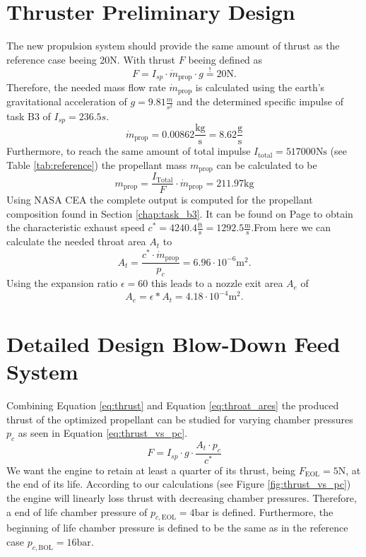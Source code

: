 \documentclass[12pt]{article}
\begin{document}
\section{Thruster Preliminary Design}
The new propulsion system should provide the same amount of thrust as the reference case beeing 20N. With thrust $F$ beeing defined as
\begin{equation}
	F = I_{sp} \cdot \dot{m}_{\text{prop}} \cdot g \overset{!}{=} 20\text{N}.
	\label{eq:thrust}
\end{equation}
Therefore, the needed mass flow rate $\dot{m}_{\text{prop}}$ is calculated using the earth's gravitational acceleration of $g=9.81\frac{m}{s^2}$ and the determined specific impulse of task B3 of $I_{sp}=236.5s$.
\begin{equation*}
	\dot{m}_{\text{prop}} = 0.00862 \frac{\text{kg}}{\text{s}} = 8.62 \frac{\text{g}}{\text{s}}
\end{equation*}
Furthermore, to reach the same amount of total impulse $I_{\text{total}}=517000\text{Ns}$ (see Table \ref{tab:reference}) the propellant mass $m_{\text{prop}}$ can be calculated to be
\begin{equation*}
	m_{\text{prop}} = \frac{I_{\text{Total}}}{F} \cdot \dot{m}_{\text{prop}} =  211.97\text{kg}
\end{equation*}
Using NASA CEA the complete output is computed for the propellant composition found in Section \ref{chap:task_b3}. It can be found on Page \pageref{chap:cea_output} to obtain the characteristic exhaust speed $c^*=4240.4\frac{\text{ft}}{\text{s}}=1292.5\frac{\text{m}}{\text{s}}$.From here we can calculate the needed throat area $A_t$ to
\begin{equation*}
	A_t = \frac{c^* \cdot \dot{m}_{\text{prop}}}{p_c} = 6.96 \cdot 10^{-6} \text{m}^2.
	\label{eq:throat_ares}
\end{equation*}
Using the expansion ratio $\epsilon=60$ this leads to a nozzle exit area $A_e$ of
\begin{equation*}
A_e = \epsilon * A_t = 4.18 \cdot 10^{-4} \text{m}^2.
\end{equation*}

\section{Detailed Design Blow-Down Feed System}
Combining Equation \ref{eq:thrust} and Equation \ref{eq:throat_ares} the produced thrust of the optimized propellant can be studied for varying chamber pressures $p_c$ as seen in Equation \ref{eq:thrust_vs_pc}.
\begin{equation}
	F = I_{sp} \cdot g \cdot \frac{A_t\cdot p_c}{c^*}
	\label{eq:thrust_vs_pc}
\end{equation}
We want the engine to retain at least a quarter of its thrust, being $F_{\text{EOL}}=5\text{N}$, at the end of its life. According to our calculations (see Figure \ref{fig:thrust_vs_pc}) the engine will linearly loss thrust with decreasing chamber pressures. Therefore, a end of life chamber pressure of $p_{c,\text{EOL}}=4\text{bar}$ is defined. Furthermore, the beginning of life chamber pressure is defined to be the same as in the reference case $p_{c,\text{BOL}}=16\text{bar}$.\\
\end{document}
